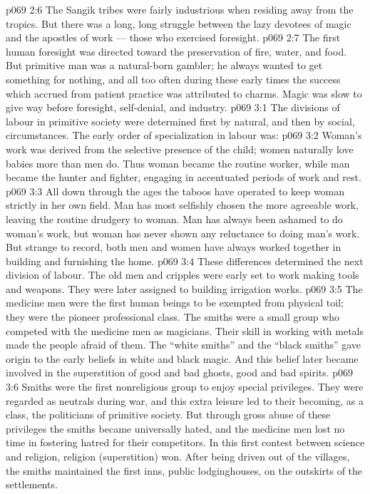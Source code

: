 \vs p069 2:6 The Sangik tribes were fairly industrious when residing away from the tropics. But there was a long, long struggle between the lazy devotees of magic and the apostles of work --- those who exercised foresight.
\vs p069 2:7 The first human foresight was directed toward the preservation of fire, water, and food. But primitive man was a natural\hyp{}born gambler; he always wanted to get something for nothing, and all too often during these early times the success which accrued from patient practice was attributed to charms. Magic was slow to give way before foresight, self\hyp{}denial, and industry.
\vs p069 3:1 The divisions of labour in primitive society were determined first by natural, and then by social, circumstances. The early order of specialization in labour was:
\vs p069 3:2 \bibnobreakspace {} Woman’s work was derived from the selective presence of the child; women naturally love babies more than men do. Thus woman became the routine worker, while man became the hunter and fighter, engaging in accentuated periods of work and rest.
\vs p069 3:3 \pc All down through the ages the taboos have operated to keep woman strictly in her own field. Man has most selfishly chosen the more agreeable work, leaving the routine drudgery to woman. Man has always been ashamed to do woman’s work, but woman has never shown any reluctance to doing man’s work. But strange to record, both men and women have always worked together in building and furnishing the home.
\vs p069 3:4 \bibnobreakspace {} These differences determined the next division of labour. The old men and cripples were early set to work making tools and weapons. They were later assigned to building irrigation works.
\vs p069 3:5 \bibnobreakspace {} The medicine men were the first human beings to be exempted from physical toil; they were the pioneer professional class. The smiths were a small group who competed with the medicine men as magicians. Their skill in working with metals made the people afraid of them. The “white smiths” and the “black smiths” gave origin to the early beliefs in white and black magic. And this belief later became involved in the superstition of good and bad ghosts, good and bad spirits.
\vs p069 3:6 Smiths were the first nonreligious group to enjoy special privileges. They were regarded as neutrals during war, and this extra leisure led to their becoming, as a class, the politicians of primitive society. But through gross abuse of these privileges the smiths became universally hated, and the medicine men lost no time in fostering hatred for their competitors. In this first contest between science and religion, religion (superstition) won. After being driven out of the villages, the smiths maintained the first inns, public lodginghouses, on the outskirts of the settlements.
